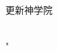 \makeatletter
\begin{titlepage}
  \begin{center}
    更新神学院
    \\[7cm]
    \@title
    \vfill
    \@author
    \\\@date
  \end{center}
\end{titlepage}
\makeatother"